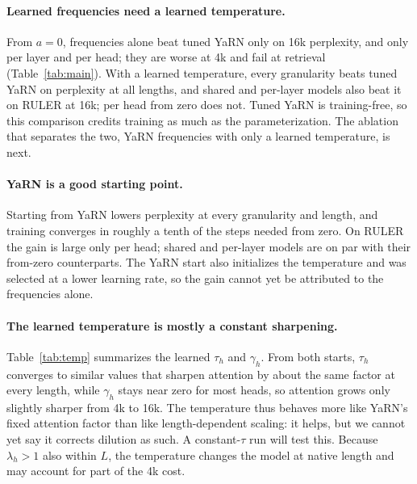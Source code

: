 %

\paragraph{Learned frequencies need a learned temperature.}
From $a = 0$, frequencies alone beat tuned YaRN only on 16k perplexity, and only per layer and per head; they are worse at 4k and fail at retrieval (Table~\ref{tab:main}). With a learned temperature, every granularity beats tuned YaRN on perplexity at all lengths, and shared and per-layer models also beat it on RULER at 16k; per head from zero does not. Tuned YaRN is training-free, so this comparison credits training as much as the parameterization. The ablation that separates the two, YaRN frequencies with only a learned temperature, is next.

\paragraph{YaRN is a good starting point.}
Starting from YaRN lowers perplexity at every granularity and length, and training converges in roughly a tenth of the steps needed from zero. On RULER the gain is large only per head; shared and per-layer models are on par with their from-zero counterparts. The YaRN start also initializes the temperature and was selected at a lower learning rate, so the gain cannot yet be attributed to the frequencies alone.

\paragraph{The learned temperature is mostly a constant sharpening.}
Table~\ref{tab:temp} summarizes the learned $\tau_h$ and $\gamma_h$. From both starts, $\tau_h$ converges to similar values that sharpen attention by about the same factor at every length, while $\gamma_h$ stays near zero for most heads, so attention grows only slightly sharper from 4k to 16k. The temperature thus behaves more like YaRN's fixed attention factor than like length-dependent scaling: it helps, but we cannot yet say it corrects dilution as such. A constant-$\tau$ run will test this. Because $\lambda_h > 1$ also within $L$, the temperature changes the model at native length and may account for part of the 4k cost.

